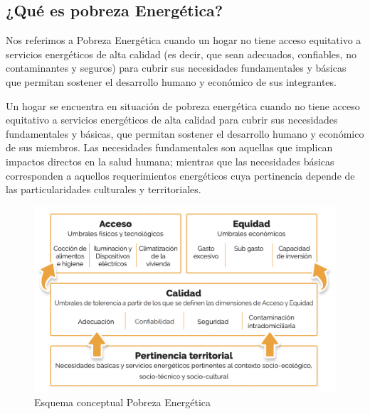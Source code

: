 \documentclass[
]{book}
\begin{document}
\hypertarget{quuxe9-es-pobreza-energuxe9tica}{%
\subsection{¿Qué es pobreza Energética?}\label{quuxe9-es-pobreza-energuxe9tica}}

Nos referimos a Pobreza Energética cuando un hogar no tiene acceso equitativo a servicios energéticos de alta calidad (es decir, que sean adecuados, confiables, no contaminantes y seguros) para cubrir sus necesidades fundamentales y básicas que permitan sostener el desarrollo humano y económico de sus integrantes.

Un hogar se encuentra en situación de pobreza energética cuando no tiene acceso equitativo a servicios energéticos de alta calidad para cubrir sus necesidades fundamentales y básicas, que permitan sostener el desarrollo humano y económico de sus miembros. Las necesidades fundamentales son aquellas que implican impactos directos en la salud humana; mientras que las necesidades básicas corresponden a aquellos requerimientos energéticos cuya pertinencia depende de las particularidades culturales y territoriales.

\begin{figure}

{\centering \includegraphics[width=1\linewidth]{images/esquema_PE} 

}

\caption{Esquema conceptual Pobreza Energética}\label{fig:unnamed-chunk-2}
\end{figure}
\end{document}
